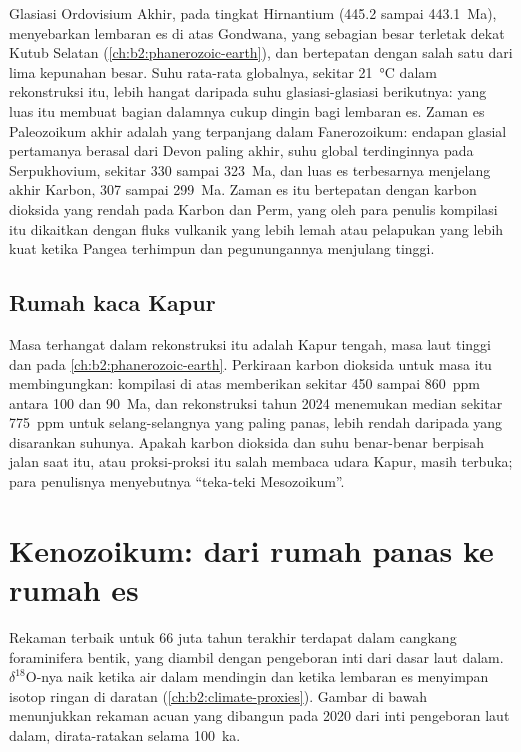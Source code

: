 Glasiasi Ordovisium Akhir, pada tingkat Hirnantium (445.2 sampai \qty{443.1}{Ma}), menyebarkan lembaran es
di atas Gondwana, yang sebagian besar terletak dekat Kutub Selatan (\cref{ch:b2:phanerozoic-earth}), dan
bertepatan dengan salah satu dari lima kepunahan besar. Suhu rata-rata globalnya, sekitar
\qty{21}{\celsius} dalam rekonstruksi itu, lebih hangat daripada suhu glasiasi-glasiasi berikutnya: 
yang luas itu membuat bagian dalamnya cukup dingin bagi lembaran es. Zaman es Paleozoikum akhir adalah
yang terpanjang dalam Fanerozoikum: endapan glasial pertamanya berasal dari Devon paling akhir, suhu global
terdinginnya pada Serpukhovium, sekitar 330 sampai \qty{323}{Ma}, dan luas
es terbesarnya menjelang akhir Karbon, 307 sampai \qty{299}{Ma}. Zaman es itu bertepatan dengan karbon
dioksida yang rendah pada Karbon dan Perm, yang oleh para penulis kompilasi itu dikaitkan dengan fluks vulkanik yang lebih lemah
atau pelapukan yang lebih kuat ketika Pangea terhimpun dan pegunungannya menjulang tinggi.

\subsection*{Rumah kaca Kapur}

Masa terhangat dalam rekonstruksi itu adalah Kapur tengah, masa laut tinggi dan
 pada \cref{ch:b2:phanerozoic-earth}. Perkiraan karbon dioksida untuk
masa itu membingungkan: kompilasi di atas memberikan sekitar 450 sampai \qty{860}{ppm} antara 100 dan
\qty{90}{Ma}, dan rekonstruksi tahun 2024 menemukan median sekitar \qty{775}{ppm} untuk selang-selangnya yang paling panas,
lebih rendah daripada yang disarankan suhunya. Apakah karbon dioksida dan suhu benar-benar berpisah
jalan saat itu, atau proksi-proksi itu salah membaca udara Kapur, masih terbuka; para penulisnya menyebutnya ``teka-teki
Mesozoikum''.

\section{Kenozoikum: dari rumah panas ke rumah es}\label{sec:b2:deep-time-climate:cenozoic}

Rekaman terbaik untuk 66 juta tahun terakhir terdapat dalam cangkang foraminifera bentik, yang diambil dengan pengeboran inti dari
dasar laut dalam. $\delta^{18}$O-nya naik ketika air dalam mendingin dan ketika lembaran es menyimpan
isotop ringan di daratan (\cref{ch:b2:climate-proxies}). Gambar di bawah menunjukkan rekaman
acuan yang dibangun pada 2020 dari inti pengeboran laut dalam, dirata-ratakan selama \qty{100}{ka}.

